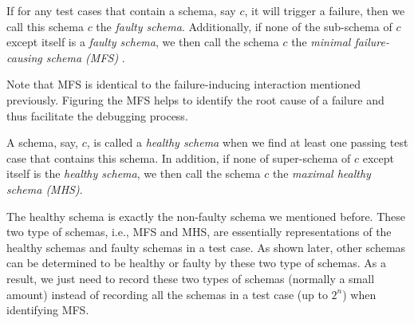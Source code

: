 \begin{definition} \label{de:faulty:minimal}
If for any test cases that contain a schema, say $c$, it will trigger a failure, then we call this schema $c$ the \emph{faulty schema}. Additionally, if none of the sub-schema of $c$  except itself is a \emph{faulty schema}, we then call the schema $c$ the \emph{minimal failure-causing schema (MFS)} \cite{nie2011minimal}.
\end{definition}

Note that MFS is identical to the failure-inducing interaction mentioned previously. %
Figuring the MFS helps to identify the root cause of a failure and thus facilitate the debugging process.


\begin{definition}\label{de:healthy:maximal}
A schema, say, $c$, is called a \emph{healthy schema} when we find at least one passing test case that contains this schema. In addition, if none of super-schema of $c$ except itself is the \emph{healthy schema}, we then call the schema $c$ the \emph{maximal healthy schema (MHS)}.
\end{definition}

The healthy schema is exactly the non-faulty schema we mentioned before. These two type of schemas, i.e., MFS and MHS, are essentially representations of the healthy schemas and faulty schemas in a test case. As shown later, other schemas can be determined to be healthy or faulty by these two type of schemas. As a result, we just need to record these two types of schemas (normally a small amount) instead of recording all the schemas in a test case (up to $2^{n}$) when identifying MFS.




%

